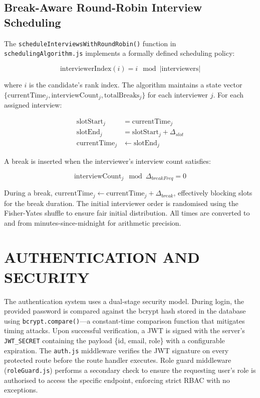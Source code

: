 \documentclass[12pt,a4paper]{report}
\begin{document}
\subsection{Break-Aware Round-Robin Interview Scheduling}

The \texttt{scheduleInterviewsWithRoundRobin()} function in \texttt{schedulingAlgorithm.js} implements a formally defined scheduling policy:

\begin{equation}
    \text{interviewerIndex}(i) = i \mod |\text{interviewers}|
\end{equation}

where $i$ is the candidate's rank index. The algorithm maintains a state vector $\{\text{currentTime}_j, \text{interviewCount}_j, \text{totalBreaks}_j\}$ for each interviewer $j$. For each assigned interview:

\begin{align}
    \text{slotStart}_j &= \text{currentTime}_j \\
    \text{slotEnd}_j &= \text{slotStart}_j + \Delta_{slot} \\
    \text{currentTime}_j &\leftarrow \text{slotEnd}_j
\end{align}

A break is inserted when the interviewer's interview count satisfies:

\begin{equation}
    \text{interviewCount}_j \mod \Delta_{breakFreq} = 0
\end{equation}

During a break, $\text{currentTime}_j \leftarrow \text{currentTime}_j + \Delta_{break}$, effectively blocking slots for the break duration. The initial interviewer order is randomised using the Fisher-Yates shuffle to ensure fair initial distribution. All times are converted to and from minutes-since-midnight for arithmetic precision.

\section{AUTHENTICATION AND SECURITY}

The authentication system uses a dual-stage security model. During login, the provided password is compared against the bcrypt hash stored in the database using \texttt{bcrypt.compare()}---a constant-time comparison function that mitigates timing attacks. Upon successful verification, a JWT is signed with the server's \texttt{JWT\_SECRET} containing the payload \{id, email, role\} with a configurable expiration. The \texttt{auth.js} middleware verifies the JWT signature on every protected route before the route handler executes. Role guard middleware (\texttt{roleGuard.js}) performs a secondary check to ensure the requesting user's role is authorised to access the specific endpoint, enforcing strict RBAC with no exceptions.
\end{document}
